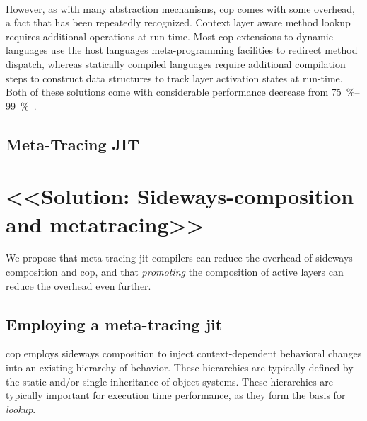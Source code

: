 \documentclass[preprint,english,10pt,nonatbib]{sigplanconf}
\begin{document}
~\cite{lincke+:2011:implementing-scoped}

However, as with many abstraction mechanisms, \ac{cop} comes with some overhead,
a fact that has been repeatedly recognized. Context layer aware method lookup
requires additional operations at run-time. Most \ac{cop} extensions to dynamic
languages use the host languages meta-programming facilities to redirect method
dispatch, whereas statically compiled languages require additional compilation
steps to construct data structures to track layer activation states at
run-time. Both of these solutions come with considerable performance decrease
from \SIrange{75}{99}{\percent}~\cite{appeltauer+:2009:comparison-context-oriented}.

\subsection{Meta-Tracing JIT}
\label{sec:meta-tracing-jit}

\section{<<Solution: Sideways-composition and metatracing>>}

We propose that meta-tracing \ac{jit} compilers can reduce the overhead of
sideways composition and \ac{cop}, and that \emph{promoting} the composition of
active layers can reduce the overhead even further.

\subsection{Employing a meta-tracing \protect\acs{jit}}
\Acl{cop} employs sideways composition to inject context-dependent behavioral
changes into an existing hierarchy of behavior. These hierarchies are typically
defined by the static and/or single inheritance of object systems. These
hierarchies are typically important for execution time performance, as they
form the basis for \emph{lookup}.
\end{document}

